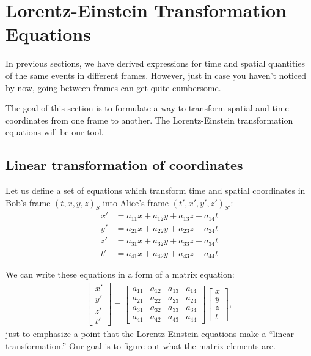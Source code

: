 \documentclass[a4paper,11pt]{article}
\numberwithin{equation}{section}
\begin{document}
 \section{Lorentz-Einstein Transformation Equations}
 In previous sections, we have derived expressions for time and spatial quantities of the same events in different frames. However, just in case you haven't noticed by now, going between frames can get quite cumbersome. 
 
 \noindent The goal of this section is to formulate a way to transform spatial and time coordinates from one frame to another. The Lorentz-Einstein transformation equations will be our tool. 
 
 \subsection{Linear transformation of coordinates}
 Let us define a set of equations which transform time and spatial coordinates in Bob's frame $(t,x,y,z)_S$ into Alice's frame $(t',x',y',z')_{S'}$:
 \begin{equation}
 \begin{split}
 x'&=a_{11}x + a_{12}y + a_{13}z + a_{14}t \\
 y'&=a_{21}x + a_{22}y + a_{23}z + a_{24}t \\
 z'&=a_{31}x + a_{32}y + a_{33}z + a_{34}t \\
 t'&=a_{41}x + a_{42}y + a_{43}z + a_{44}t 
 \end{split}
 \end{equation}
 
 \noindent We can write these equations in a form of a matrix equation:
 \begin{gather}
 \begin{bmatrix} x' \\ y' \\ z' \\ t' \end{bmatrix}
 =
 \begin{bmatrix}
 a_{11} & a_{12} & a_{13} & a_{14}\\
 a_{21} & a_{22} & a_{23} & a_{24}\\
 a_{31} & a_{32} & a_{33} & a_{34}\\
 a_{41} & a_{42} & a_{43} & a_{44}
 \end{bmatrix}
 \begin{bmatrix}
 x \\ y \\ z \\ t
 \end{bmatrix},
 \end{gather}
 just to emphasize a point that the Lorentz-Einstein equations make a ``linear transformation.'' Our goal is to figure out what the matrix elements are. 
\end{document}
